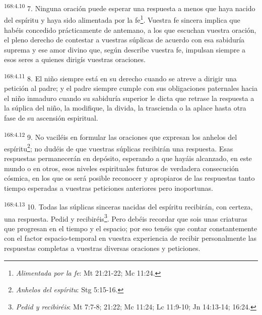 \par 
\textsuperscript{168:4.10} 7. Ninguna oración puede esperar una respuesta a menos que haya nacido del espíritu y haya sido alimentada por la fe\footnote{\textit{Alimentada por la fe}: Mt 21:21-22; Mc 11:24.}. Vuestra fe sincera implica que habéis concedido prácticamente de antemano, a los que escuchan vuestra oración, el pleno derecho de contestar a vuestras súplicas de acuerdo con esa sabiduría suprema y ese amor divino que, según describe vuestra fe, impulsan siempre a esos seres a quienes dirigís vuestras oraciones.

\par 
\textsuperscript{168:4.11} 8. El niño siempre está en su derecho cuando se atreve a dirigir una petición al padre; y el padre siempre cumple con sus obligaciones paternales hacia el niño inmaduro cuando su sabiduría superior le dicta que retrase la respuesta a la súplica del niño, la modifique, la divida, la trascienda o la aplace hasta otra fase de su ascensión espiritual.

\par 
\textsuperscript{168:4.12} 9. No vaciléis en formular las oraciones que expresan los anhelos del espíritu\footnote{\textit{Anhelos del espíritu}: Stg 5:15-16.}; no dudéis de que vuestras súplicas recibirán una respuesta. Esas respuestas permanecerán en depósito, esperando a que hayáis alcanzado, en este mundo o en otros, esos niveles espirituales futuros de verdadera consecución cósmica, en los que os será posible reconocer y apropiaros de las respuestas tanto tiempo esperadas a vuestras peticiones anteriores pero inoportunas.

\par 
\textsuperscript{168:4.13} 10. Todas las súplicas sinceras nacidas del espíritu recibirán, con certeza, una respuesta. Pedid y recibiréis\footnote{\textit{Pedid y recibiréis}: Mt 7:7-8; 21:22; Mc 11:24; Lc 11:9-10; Jn 14:13-14; 16:24.}. Pero debéis recordar que sois unas criaturas que progresan en el tiempo y el espacio; por eso tenéis que contar constantemente con el factor espacio-temporal en vuestra experiencia de recibir personalmente las respuestas completas a vuestras diversas oraciones y peticiones.

